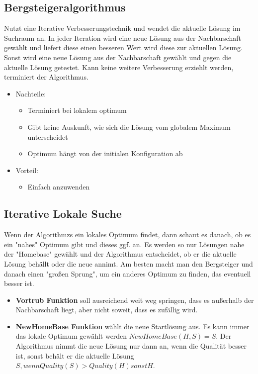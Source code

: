\documentclass[jou,apacite]{apa6}
\begin{document}
\subsection{Bergsteigeralgorithmus}
Nutzt eine Iterative Verbesserungstechnik und wendet die aktuelle Lösung im Suchraum an. In jeder Iteration wird eine neue Lösung aus der Nachbarschaft gewählt und liefert diese einen besseren Wert wird diese zur aktuellen Lösung. Sonst wird eine neue Lösung aus der Nachbarschaft gewählt und gegen die aktuelle Lösung getestet. Kann keine weitere Verbesserung erziehlt werden, terminiert der Algorithmus. 

\begin{itemize}
    \item Nachteile:
    \begin{itemize}
        \item Terminiert bei lokalem optimum
        \item Gibt keine Auskunft, wie sich die Lösung vom globalem Maximum unterscheidet
        \item Optimum hängt von der initialen Konfiguration ab
    \end{itemize}
    \item Vorteil:
    \begin{itemize}
        \item Einfach anzuwenden
    \end{itemize}
\end{itemize}

\subsection{Iterative Lokale Suche}
Wenn der Algorithmzs ein lokales Optimum findet, dann schaut es danach, ob es ein "nahes" Optimum gibt und dieses ggf. an. Es werden so nur Lösungen nahe der "Homebase" gewählt und der Algorithmus entscheidet, ob er die aktuelle Lösung behällt oder die neue annimt. Am besten macht man den Bergsteiger und danach einen "großen Sprung", um ein anderes Optimum zu finden, das eventuell besser ist. 

\begin{itemize}
    \item {\bfseries Vortrub Funktion} soll ausreichend weit weg springen, dass es außerhalb der Nachbarschaft liegt, aber nicht soweit, dass es zufällig wird.
    \item {\bfseries NewHomeBase Funktion} wählt die neue Startlösung aus. Es kann immer das lokale Optimum gewählt werden $NewHomeBase(H,S) = S$. Der Algorithmus nimmt die neue Lösung nur dann an, wenn die Qualität besser ist, sonst behält er die aktuelle Lösung $S, wenn Quality(S) > Quality(H) sonst H$.
\end{itemize}
\end{document}
